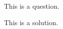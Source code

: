\begin{question}
	This is a question.
\end{question}

\begin{solution}
	This is a solution.
\end{solution}